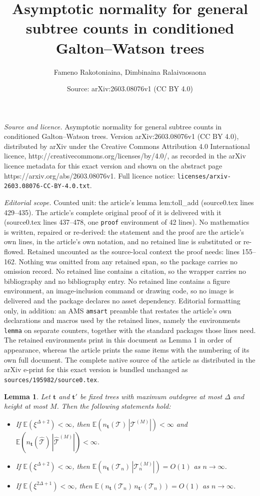 \documentclass[10pt,a4paper]{amsart}
\title{Asymptotic normality for general subtree counts in conditioned Galton--Watson trees}
\author{Fameno Rakotoniaina, Dimbinaina Ralaivaosaona}
\date{Source: arXiv:2603.08076v1 (CC BY 4.0)}
\newtheorem{lemma}{Lemma}
\newcommand{\htc}{\hat{\tc}}
\newcommand{\n}{n_{\st}}
\newcommand{\st}{\textbf{t}}
\newcommand{\tc}{\mathcal{T}}
\begin{document}
\maketitle

\noindent\emph{Source and licence.} Asymptotic normality for general subtree counts in conditioned Galton--Watson trees. Version arXiv:2603.08076v1 (CC BY 4.0), distributed by arXiv under the Creative Commons Attribution 4.0 International licence, http://creativecommons.org/licenses/by/4.0/, as recorded in the arXiv licence metadata for this exact version and shown on the abstract page https://arxiv.org/abs/2603.08076v1. Full licence notice: \texttt{licenses/arxiv-2603.08076-CC-BY-4.0.txt}.\par\smallskip

\noindent\textit{Editorial scope.} Counted unit: the article's lemma lem:toll\_add (source0.tex lines 429--435). The article's complete original proof of it is delivered with it (source0.tex lines 437--478, one \texttt{proof} environment of 42 lines). No mathematics is written, repaired or re-derived: the statement and the proof are the article's own lines, in the article's own notation, and no retained line is substituted or re-flowed.  Retained uncounted as the source-local context the proof needs: lines 155--162.  Nothing was omitted from any retained span, so the package carries no omission record.  No retained line contains a citation, so the wrapper carries no bibliography and no bibliography entry.  No retained line contains a figure environment, an image-inclusion command or drawing code, so no image is delivered and the package declares no asset dependency.  Editorial formatting only, in addition: an AMS \texttt{amsart} preamble that restates the article's own declarations and macros used by the retained lines, namely the environments \texttt{lemma} on separate counters, together with the standard packages those lines need.  The retained environments print in this document as Lemma 1 in order of appearance, whereas the article prints the same items with the numbering of its own full document.  The complete native source of the article as distributed in the arXiv e-print for this exact version is bundled unchanged as \texttt{sources/195982/source0.tex}.
\begin{lemma}\label{expectation of products of n(T) with finite tree size}
Let $\st$ and $\st'$ be fixed trees with maximum outdegree at most $\Delta$ and height at most $M$. Then the following statements hold:
\begin{itemize}
\item[(a)] If $\mathbb{E}(\xi^{\Delta+2}) < \infty$, then $\mathbb{E}(\n(\tc)\,|\tc^{(M)}|) < \infty$ and $\mathbb{E}(\n(\htc)\,|\htc^{(M)}|) < \infty$.\label{st:a}
\item[(b)] If $\mathbb{E}(\xi^{\Delta+2}) < \infty$, then $\mathbb{E}(\n(\tc_n)\,|\tc_n^{(M)}|) = O(1)$ as $n \to \infty$.
\item[(c)] If $\mathbb{E}(\xi^{2\Delta+1}) < \infty$, then $\mathbb{E}(n_{\st}(\tc_n)\,n_{\st'}(\tc_n)) = O(1)$ as $n \to \infty$.
\end{itemize}
\end{lemma}
\end{document}
